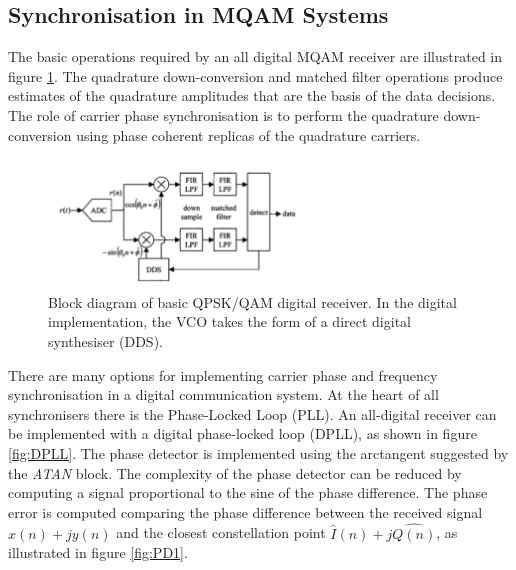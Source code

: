 \documentclass[12pt,a4paper,openright]{report}
\begin{document}
\subsection{Synchronisation in MQAM Systems}
\label{subsec:MQAMsynch}
The basic operations required by an all digital MQAM receiver are illustrated in figure \ref{fig:rxMQAM}. The quadrature down-conversion and matched filter operations produce estimates of the quadrature amplitudes that are the basis of the data decisions. The role of carrier phase synchronisation is to perform the quadrature down-conversion using phase coherent replicas of the quadrature carriers.

 \begin{figure}[H]
  \centering
    \includegraphics[width=0.6\textwidth]{rxMQAM.pdf}
    \caption[Block diagram of basic QPSK/QAM digital receiver]{Block diagram of basic QPSK/QAM digital receiver. In the digital implementation, the VCO takes the form of a direct digital synthesiser (DDS).}
    \label{fig:rxMQAM}
\end{figure}

There are many options for implementing carrier phase and frequency synchronisation in a digital communication system. At the heart of all synchronisers there is the Phase-Locked Loop (PLL). An all-digital receiver can be implemented with a digital phase-locked loop (DPLL), as shown in figure \ref{fig:DPLL}. The phase detector is implemented using the arctangent suggested by the \emph{ATAN} block. The complexity of the phase detector can be reduced by computing a signal proportional to the sine of the phase difference. The phase error is computed comparing the phase difference between the received signal $x(n) + jy(n)$ and the closest constellation point $\hat{I}(n) + j\hat{Q(n)}$, as illustrated in figure \ref{fig:PD1}.
\end{document}
